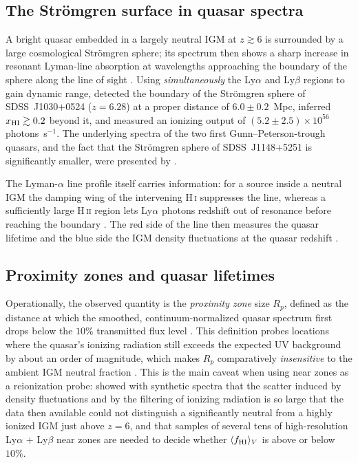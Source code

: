 \documentclass[11pt,a4paper]{article}
\newcommand{\ion}[2]{\textrm{#1\,\textsc{#2}}}
\begin{document}
\subsection{The Str\"omgren surface in quasar spectra}
A bright quasar embedded in a largely neutral IGM at $z\gtrsim6$ is surrounded by a large
cosmological Str\"omgren sphere; its spectrum then shows a sharp increase in resonant Lyman-line
absorption at wavelengths approaching the boundary of the sphere along the line of sight
\citep{Mesinger2004}. Using \emph{simultaneously} the Ly$\alpha$ and Ly$\beta$ regions to gain
dynamic range, \citet{Mesinger2004} detected the boundary of the Str\"omgren sphere of
SDSS~J1030$+$0524 ($z=6.28$) at a proper distance of $6.0\pm0.2$~Mpc, inferred $x_{\rm HI}\gtrsim0.2$
beyond it, and measured an ionizing output of $(5.2\pm2.5)\times10^{56}$ photons~s$^{-1}$. The
underlying spectra of the two first Gunn--Peterson-trough quasars, and the fact that the Str\"omgren
sphere of SDSS~J1148$+$5251 is significantly smaller, were presented by \citet{White2003}.

The Lyman-$\alpha$ line profile itself carries information: for a source inside a neutral IGM the
damping wing of the intervening \ion{H}{i} suppresses the line, whereas a sufficiently large
\ion{H}{ii} region lets Ly$\alpha$ photons redshift out of resonance before reaching the boundary
\citep{Cen2000}. The red side of the line then measures the quasar lifetime and the blue side the
IGM density fluctuations at the quasar redshift \citep{Cen2000}.

\subsection{Proximity zones and quasar lifetimes}
Operationally, the observed quantity is the \emph{proximity zone} size $R_p$, defined as the distance
at which the smoothed, continuum-normalized quasar spectrum first drops below the $10\%$ transmitted
flux level \citep{Eilers2017}. This definition probes locations where the quasar's ionizing radiation
still exceeds the expected UV background by about an order of magnitude, which makes $R_p$
comparatively \emph{insensitive} to the ambient IGM neutral fraction \citep{Eilers2017}. This is the
main caveat when using near zones as a reionization probe: \citet{Bolton2007} showed with synthetic
spectra that the scatter induced by density fluctuations and by the filtering of ionizing radiation
is so large that the data then available could not distinguish a significantly neutral from a highly
ionized IGM just above $z=6$, and that samples of several tens of high-resolution Ly$\alpha$ +
Ly$\beta$ near zones are needed to decide whether $\langle f_{\rm HI}\rangle_V$ is above or below
$10\%$.
\end{document}
